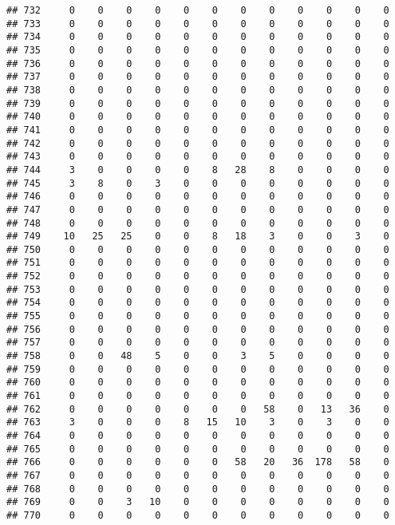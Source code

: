 \documentclass[]{article}
\begin{document}
\begin{verbatim}
## 732     0    0    0    0    0    0    0    0    0    0    0    0
## 733     0    0    0    0    0    0    0    0    0    0    0    0
## 734     0    0    0    0    0    0    0    0    0    0    0    0
## 735     0    0    0    0    0    0    0    0    0    0    0    0
## 736     0    0    0    0    0    0    0    0    0    0    0    0
## 737     0    0    0    0    0    0    0    0    0    0    0    0
## 738     0    0    0    0    0    0    0    0    0    0    0    0
## 739     0    0    0    0    0    0    0    0    0    0    0    0
## 740     0    0    0    0    0    0    0    0    0    0    0    0
## 741     0    0    0    0    0    0    0    0    0    0    0    0
## 742     0    0    0    0    0    0    0    0    0    0    0    0
## 743     0    0    0    0    0    0    0    0    0    0    0    0
## 744     3    0    0    0    0    8   28    8    0    0    0    0
## 745     3    8    0    3    0    0    0    0    0    0    0    0
## 746     0    0    0    0    0    0    0    0    0    0    0    0
## 747     0    0    0    0    0    0    0    0    0    0    0    0
## 748     0    0    0    0    0    0    0    0    0    0    0    0
## 749    10   25   25    0    0    8   18    3    0    0    3    0
## 750     0    0    0    0    0    0    0    0    0    0    0    0
## 751     0    0    0    0    0    0    0    0    0    0    0    0
## 752     0    0    0    0    0    0    0    0    0    0    0    0
## 753     0    0    0    0    0    0    0    0    0    0    0    0
## 754     0    0    0    0    0    0    0    0    0    0    0    0
## 755     0    0    0    0    0    0    0    0    0    0    0    0
## 756     0    0    0    0    0    0    0    0    0    0    0    0
## 757     0    0    0    0    0    0    0    0    0    0    0    0
## 758     0    0   48    5    0    0    3    5    0    0    0    0
## 759     0    0    0    0    0    0    0    0    0    0    0    0
## 760     0    0    0    0    0    0    0    0    0    0    0    0
## 761     0    0    0    0    0    0    0    0    0    0    0    0
## 762     0    0    0    0    0    0    0   58    0   13   36    0
## 763     3    0    0    0    8   15   10    3    0    3    0    0
## 764     0    0    0    0    0    0    0    0    0    0    0    0
## 765     0    0    0    0    0    0    0    0    0    0    0    0
## 766     0    0    0    0    0    0   58   20   36  178   58    0
## 767     0    0    0    0    0    0    0    0    0    0    0    0
## 768     0    0    0    0    0    0    0    0    0    0    0    0
## 769     0    0    3   10    0    0    0    0    0    0    0    0
## 770     0    0    0    0    0    0    0    0    0    0    0    0

\end{verbatim}
\end{document}
